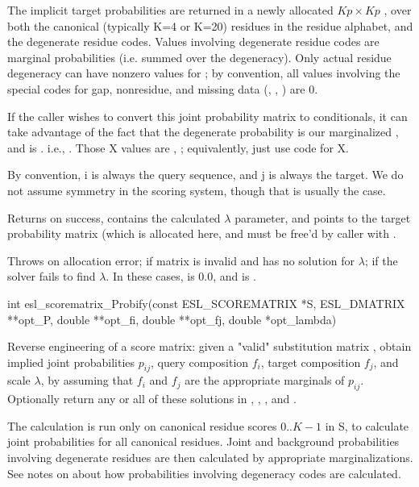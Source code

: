 \begin{sreapi}
The implicit target probabilities are returned in a
newly allocated $Kp \times Kp$ , over both
the canonical (typically K=4 or K=20) residues in the
residue alphabet, and the degenerate residue codes.
Values involving degenerate residue codes are marginal
probabilities (i.e. summed over the degeneracy).
Only actual residue degeneracy can have nonzero values
for ; by convention, all values involving the
special codes for gap, nonresidue, and missing data
(, , ) are 0.

If the caller wishes to convert this joint probability
matrix to conditionals, it can take advantage of the
fact that the degenerate probability  is our
marginalized , and  is . 
i.e., .
Those X values are ,
; equivalently, just use
code  for X.

By convention, i is always the query sequence, and j is
always the target. We do not assume symmetry in the
scoring system, though that is usually the case.

Returns  on success,  contains the
calculated $\lambda$ parameter, and  points to
the target probability matrix (which is allocated here,
and must be free'd by caller with .

Throws  on allocation error; 
 if matrix is invalid and has no solution for $\lambda$;
 if the solver fails to find $\lambda$.
In these cases,  is 0.0, and  is . 


\hypertarget{func:esl_scorematrix_Probify()}
{\item[int esl\_scorematrix\_Probify(const ESL\_SCOREMATRIX *S, ESL\_DMATRIX **opt\_P, double **opt\_fi, double **opt\_fj, double *opt\_lambda)]}

Reverse engineering of a score matrix: given a "valid"
substitution matrix , obtain implied joint
probabilities $p_{ij}$, query composition $f_i$, target
composition $f_j$, and scale $\lambda$, by assuming that
$f_i$ and $f_j$ are the appropriate marginals of $p_{ij}$.
Optionally return any or all of these solutions in
, , , and .

The calculation is run only on canonical residue scores
$0..K-1$ in S, to calculate joint probabilities for all
canonical residues. Joint and background probabilities 
involving degenerate residues are then calculated by
appropriate marginalizations. See notes on
 about how probabilities
involving degeneracy codes are calculated.


\end{sreapi}

